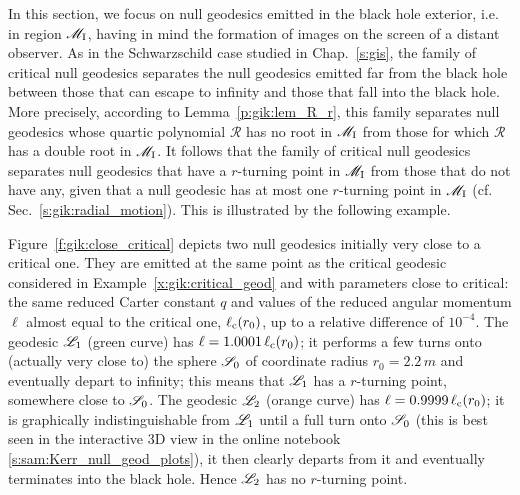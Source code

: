 In this section, we focus on null geodesics emitted in the black hole
exterior, i.e. in region $\mathscr{M}_{\rm I}$, having in mind the formation
of images on the screen of a distant observer.
As in the Schwarzschild case studied in Chap.~\ref{s:gis}, the family
of critical null geodesics separates the null geodesics emitted far from the
black hole between those
that can escape to infinity and those that fall into the black hole.
More precisely, according to Lemma~\ref{p:gik:lem_R_r},
this family separates null geodesics whose quartic polynomial $\mathscr{R}$
has no root in $\mathscr{M}_{\rm I}$ from those for which $\mathscr{R}$ has a double
root in $\mathscr{M}_{\rm I}$. It follows that the family of critical null
geodesics separates null geodesics that have a $r$-turning
point in $\mathscr{M}_{\rm I}$ from those that do not have any, given that a null geodesic has at most
one $r$-turning point in $\mathscr{M}_{\rm I}$ (cf. Sec.~\ref{s:gik:radial_motion}).
This is illustrated by the following example.

\begin{texample}{}{}
Figure~\ref{f:gik:close_critical} depicts
two null geodesics initially very close to a critical one.
They are emitted at the same point as the critical geodesic considered in Example~\ref{x:gik:critical_geod}
and with parameters close to critical: the same reduced Carter constant $q$
and values of the reduced angular momentum $\ell$ almost equal to the critical
one, $\ell_{\rm c}(r_0)$, up to a relative difference of $10^{-4}$.
The geodesic $\mathscr{L}_1$ (green curve) has $\ell = 1.0001\,\ell_{\rm c}(r_0)$; it performs a few
turns onto (actually very close to) the sphere $\mathscr{S}_0$ of coordinate radius $r_0 = 2.2\, m$ and eventually depart to infinity; this means that $\mathscr{L}_1$ has a $r$-turning point, somewhere close
to $\mathscr{S}_0$.
The geodesic $\mathscr{L}_2$ (orange curve) has $\ell = 0.9999\,\ell_{\rm c}(r_0)$; it is
graphically indistinguishable from $\mathscr{L}_1$ until a full turn onto $\mathscr{S}_0$
(this is best seen in the interactive 3D view in the online notebook \ref{s:sam:Kerr_null_geod_plots}),
it then clearly
departs from it and eventually terminates into the black hole. Hence $\mathscr{L}_2$ has no $r$-turning
point.
\end{texample}

